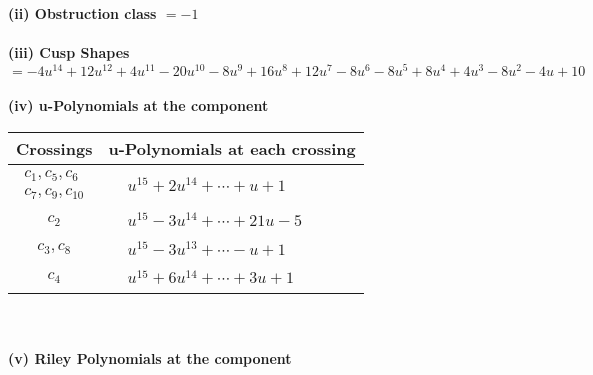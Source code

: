 \documentclass[1p]{elsarticle_modified}
\theoremstyle{definition}
\begin{document}
\flushleft \textbf{(ii) Obstruction class $= -1$}\\~\\
\flushleft \textbf{(iii) Cusp Shapes $= -4 u^{14}+12 u^{12}+4 u^{11}-20 u^{10}-8 u^9+16 u^8+12 u^7-8 u^6-8 u^5+8 u^4+4 u^3-8 u^2-4 u+10$}\\~\\
\newpage\renewcommand{\arraystretch}{1}
\flushleft \textbf{(iv) u-Polynomials at the component}\newline \\
\begin{tabular}{m{50pt}|m{274pt}}
Crossings & \hspace{64pt}u-Polynomials at each crossing \\
\hline $$\begin{aligned}c_{1},c_{5},c_{6}\\c_{7},c_{9},c_{10}\end{aligned}$$&$\begin{aligned}
&u^{15}+2 u^{14}+\cdots+u+1
\end{aligned}$\\
\hline $$\begin{aligned}c_{2}\end{aligned}$$&$\begin{aligned}
&u^{15}-3 u^{14}+\cdots+21 u-5
\end{aligned}$\\
\hline $$\begin{aligned}c_{3},c_{8}\end{aligned}$$&$\begin{aligned}
&u^{15}-3 u^{13}+\cdots- u+1
\end{aligned}$\\
\hline $$\begin{aligned}c_{4}\end{aligned}$$&$\begin{aligned}
&u^{15}+6 u^{14}+\cdots+3 u+1
\end{aligned}$\\
\hline
\end{tabular}\\~\\
\newpage\renewcommand{\arraystretch}{1}
\flushleft \textbf{(v) Riley Polynomials at the component}\newline \\
\end{document}

